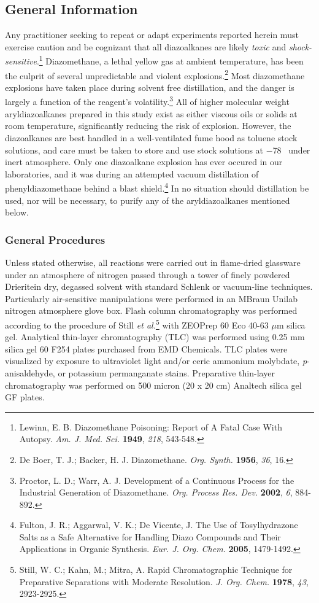 \subsection{General Information}
Any practitioner seeking to repeat or adapt experiments reported herein must exercise caution and be
cognizant that all diazoalkanes are likely \textit{toxic} and
\textit{shock-sensitive}.\footnote{{\frenchspacing Lewinn, E. B. Diazomethane Poisoning: Report of A
Fatal Case With Autopsy. \textit{Am. J. Med. Sci.} \textbf{1949}, \textit{218}, 543-548.}} Diazomethane, a lethal yellow gas at ambient temperature, has been the culprit of several unpredictable and violent explosions.\footnote{{\frenchspacing De Boer, T. J.; Backer, H. J. Diazomethane. \textit{Org.
Synth.} \textbf{1956}, \textit{36}, 16.}} Most diazomethane explosions have taken place during
solvent free distillation, and the danger is largely a function of the reagent's
volatility.\footnote{{\frenchspacing Proctor, L. D.; Warr, A. J. Development of a Continuous Process
for the Industrial Generation of Diazomethane. \textit{Org. Process Res. Dev.} \textbf{2002},
\textit{6}, 884-892.}} All of higher molecular weight aryldiazoalkanes prepared in this study exist
as either viscous oils or solids at room temperature, significantly reducing the risk of explosion.
However, the diazoalkanes are best handled in a well-ventilated fume hood as toluene stock
solutions, and care must be taken to store and use stock solutions at $-$78 \degc\  under inert
atmosphere. Only one diazoalkane explosion has ever occured in our laboratories, and it was during
an attempted vacuum distillation of phenyldiazomethane behind a blast shield.\footnote{{\frenchspacing Fulton, J. R.;
Aggarwal, V. K.; De Vicente, J. The Use of Tosylhydrazone Salts as a Safe Alternative for Handling
Diazo Compounds and Their Applications in Organic Synthesis. \textit{Eur. J. Org. Chem.}
\textbf{2005}, 1479-1492.}} In no situation should distillation be used, nor will be necessary, to
purify any of the aryldiazoalkanes mentioned below.
\subsubsection{General Procedures}
Unless stated otherwise, all reactions were carried out in flame-dried glassware under an atmosphere
of nitrogen passed through a tower of finely powdered Drierite\regtm in dry, degassed solvent with
standard Schlenk or vacuum-line techniques. Particularly air-sensitive manipulations were performed
in an MBraun Unilab nitrogen atmosphere glove box. Flash column chromatography was performed
according to the procedure of Still  \textit{et al.}\footnote{{\frenchspacing Still, W. C.; Kahn,
M.; Mitra, A. Rapid Chromatographic Technique for Preparative Separations with Moderate Resolution. \textit{J.
Org. Chem.} \textbf{1978}, \textit{43}, 2923-2925.}} with ZEOPrep 60 Eco 40-63 $\mu$m silica gel.
Analytical thin-layer chromatography (TLC) was performed using 0.25 mm silica gel 60 F254 plates purchased from
EMD Chemicals. TLC plates were visualized by exposure to ultraviolet light and/or ceric ammonium
molybdate, \textit{p}-anisaldehyde, or potassium permanganate stains.
 Preparative thin-layer chromatography was performed on 500 micron (20 x 20 cm) Analtech silica gel
GF plates.
